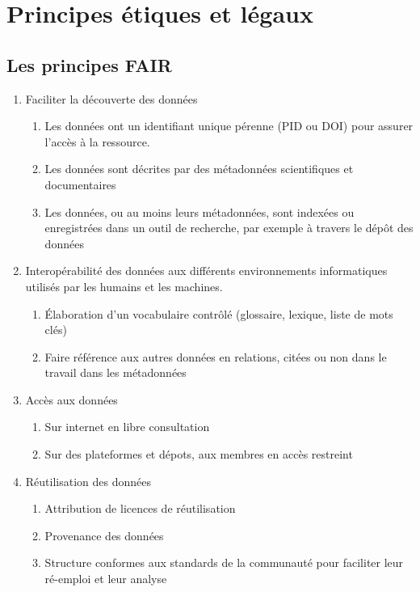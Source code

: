 \documentclass{book}
\begin{document}
\section{Principes étiques et légaux}

\subsection{Les principes FAIR}

\begin{enumerate}
	\item Faciliter la découverte des données
	      \begin{enumerate}
	      	\item Les données ont un identifiant unique pérenne (PID ou DOI) pour assurer l'accès à la ressource.
	      	\item Les données sont décrites par des métadonnées scientifiques et documentaires
	      	\item Les données, ou au moins leurs métadonnées, sont indexées ou enregistrées dans un outil de recherche, par exemple à travers le dépôt des données
	      \end{enumerate}
	\item Interopérabilité des données aux différents environnements informatiques utilisés par les humains et les machines.
	      \begin{enumerate}
	      	\item Élaboration d'un vocabulaire contrôlé (glossaire, lexique, liste de mots clés)
	      	\item Faire référence aux autres données en relations, citées ou non dans le travail dans les métadonnées
	      \end{enumerate}
	\item Accès aux données
	      \begin{enumerate}
	      	\item Sur internet en libre consultation
	      	\item Sur des plateformes et dépots, aux membres en accès restreint
	      \end{enumerate}
	\item Réutilisation des données
	      \begin{enumerate}
	      	\item Attribution de licences de réutilisation
	      	\item Provenance des données
	      	\item Structure conformes aux standards de la communauté pour faciliter leur ré-emploi et leur analyse
	      \end{enumerate}
\end{enumerate}
\end{document}

